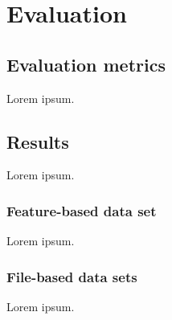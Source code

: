 
\section{Evaluation}

\subsection{Evaluation metrics}

Lorem ipsum.

\subsection{Results}

Lorem ipsum.

\subsubsection*{Feature-based data set}

Lorem ipsum.

\subsubsection*{File-based data sets}

Lorem ipsum.
